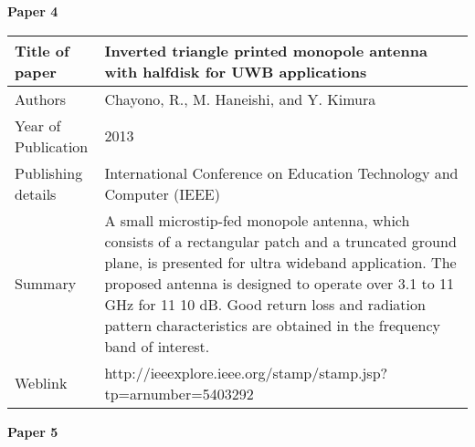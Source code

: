 	\begin{flushleft}
		\textbf{Paper 4}
	\end{flushleft}


		   	\begin{table}[h]
		   		\centering
		   		\begin{tabular}{ |l|p{11cm}| }
		   			\hline
		   			Title of paper &  Inverted triangle printed monopole antenna with halfdisk for UWB applications \\
		   			\hline
		   			Authors & Chayono, R., M. Haneishi, and Y. Kimura \\
		   			\hline
		   			Year of Publication & 2013 \\
		   			\hline
		   			Publishing details & International Conference on Education Technology and Computer (IEEE) \\ \hline
		   			Summary & A small microstip-fed monopole antenna, which consists of a rectangular patch and a truncated ground plane, is presented for ultra wideband application. The proposed antenna is designed to operate over 3.1 to 11 GHz for 11 10 dB. Good return loss and radiation pattern characteristics are obtained in the frequency band of interest.\\
		   			\hline
		   			Weblink & http://ieeexplore.ieee.org/stamp/stamp.jsp?tp=arnumber=5403292 \\
		   			\hline
		   		\end{tabular}

		   	\end{table}

  	  \cleardoublepage
  	  
		\begin{flushleft}
			\textbf{Paper 5}
		\end{flushleft}



